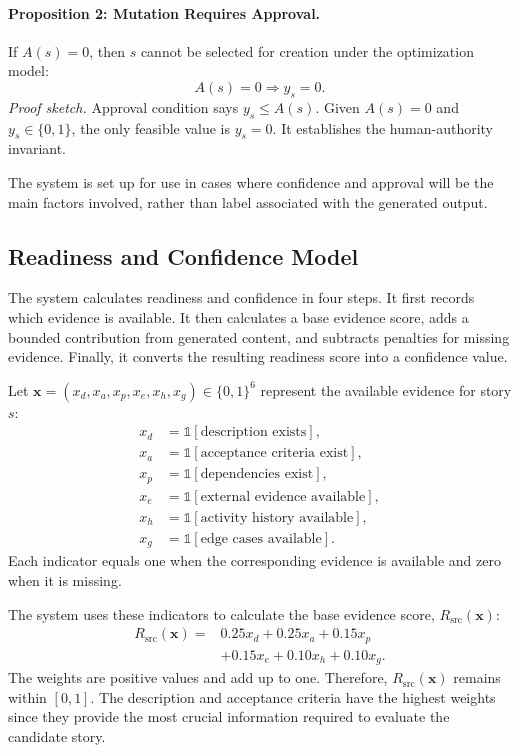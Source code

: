 \documentclass[manuscript,review]{acmart}
\begin{document}
\paragraph{Proposition 2: Mutation Requires Approval.}
If $A(s)=0$, then $s$ cannot be selected for creation under the optimization model:
\begin{equation}
A(s)=0 \Rightarrow y_s=0.
\end{equation}
\textit{Proof sketch.}
Approval condition says $y_s\le A(s)$. Given $A(s)=0$ and $y_s\in\{0,1\}$, the only feasible value is $y_s=0$. It establishes the human-authority invariant.

The system is set up for use in cases where confidence and approval will be the main factors involved, rather than label associated with the generated output.

\subsection{Readiness and Confidence Model}
\label{sec:readiness-confidence-model}

The system calculates readiness and confidence in four steps. It first records which evidence is available. It then calculates a base evidence score, adds a bounded contribution from generated content, and subtracts penalties for missing evidence. Finally, it converts the resulting readiness score into a confidence value.

Let $\mathbf{x}=(x_d,x_a,x_p,x_e,x_h,x_g)\in\{0,1\}^6$ represent the available evidence for story $s$:
\begin{align}
	x_d &= \mathbb{1}[\text{description exists}], \\
	x_a &= \mathbb{1}[\text{acceptance criteria exist}], \\
	x_p &= \mathbb{1}[\text{dependencies exist}], \\
	x_e &= \mathbb{1}[\text{external evidence available}], \\
	x_h &= \mathbb{1}[\text{activity history available}], \\
	x_g &= \mathbb{1}[\text{edge cases available}].
\end{align}
Each indicator equals one when the corresponding evidence is available and zero when it is missing.

The system uses these indicators to calculate the base evidence score, $R_{\text{src}}(\mathbf{x})$:
\begin{equation}
	\begin{aligned}
		R_{\text{src}}(\mathbf{x}) ={}& 0.25x_d + 0.25x_a + 0.15x_p \\
		&+ 0.15x_e + 0.10x_h + 0.10x_g.
	\end{aligned}
\end{equation}
The weights are positive values and add up to one. Therefore, $R_{\text{src}}(\mathbf{x})$ remains within $[0,1]$. The description and acceptance criteria have the highest weights since they provide the most crucial information required to evaluate the candidate story.
\end{document}
